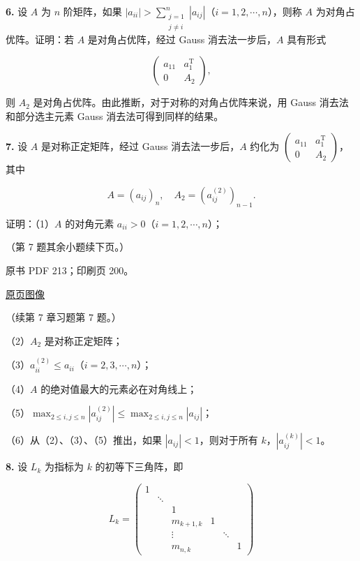 \documentclass[
  10pt,
  fontset=fandol]{ctexart}
\begin{document}
\textbf{6.} 设 \(A\) 为 \(n\) 阶矩阵，如果
\(|a_{ii}|>\sum_{\substack{j=1\\j\neq i}}^{n}|a_{ij}|\)（\(i=1,2,\cdots,n\)），则称
\(A\) 为对角占优阵。证明：若 \(A\) 是对角占优阵，经过 Gauss
消去法一步后，\(A\) 具有形式

\[
\begin{pmatrix}a_{11}&a_1^{\mathrm T}\\0&A_2\end{pmatrix},
\]

则 \(A_2\) 是对角占优阵。由此推断，对于对称的对角占优阵来说，用 Gauss
消去法和部分选主元素 Gauss 消去法可得到同样的结果。

\textbf{7.} 设 \(A\) 是对称正定矩阵，经过 Gauss 消去法一步后，\(A\)
约化为
\(\begin{pmatrix}a_{11}&a_1^{\mathrm T}\\0&A_2\end{pmatrix}\)，其中

\[
A=(a_{ij})_n,\quad A_2=(a_{ij}^{(2)})_{n-1}.
\]

证明：（1）\(A\) 的对角元素 \(a_{ii}>0\)（\(i=1,2,\cdots,n\)）；

（第 7 题其余小题续下页。）

\clearpage

原书 PDF 213；印刷页 200。

\href{/Users/xiangjunfeng/Desktop/数值计算专用/numerical-analysis/book/source-images/pdf-213.jpeg}{原页图像}

（续第 7 章习题第 7 题。）

（2）\(A_2\) 是对称正定矩阵；

（3）\(a_{ii}^{(2)}\leqslant a_{ii}\)（\(i=2,3,\cdots,n\)）；

（4）\(A\) 的绝对值最大的元素必在对角线上；

（5）\(\max_{2\leqslant i,j\leqslant n}|a_{ij}^{(2)}|\leqslant\max_{2\leqslant i,j\leqslant n}|a_{ij}|\)；

（6）从（2）、（3）、（5）推出，如果 \(|a_{ij}|<1\)，则对于所有
\(k\)，\(|a_{ij}^{(k)}|<1\)。

\textbf{8.} 设 \(L_k\) 为指标为 \(k\) 的初等下三角阵，即

\[
L_k=\begin{pmatrix}
1&&&&&\\
&\ddots&&&&\\
&&1&&&\\
&&m_{k+1,k}&1&&\\
&&\vdots&&\ddots&\\
&&m_{n,k}&&&1
\end{pmatrix}
\]
\end{document}
